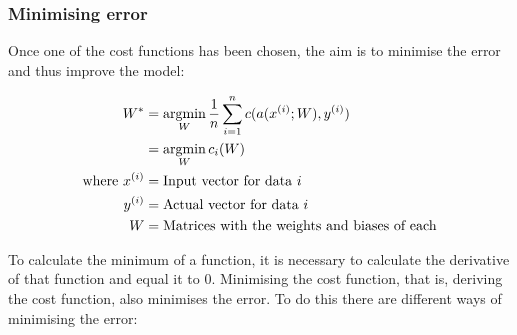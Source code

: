 \subsubsection{Minimising error}\label{minimizing-error}

Once one of the cost functions has been chosen, the aim is to minimise the error and thus improve the model:

\begin{equation}
\begin{split}
        W^* &= \operatorname*{argmin}_{W} \frac{1}{n} \sum_{i=1}^n c(a(x^{(i)}; W), y^{(i)}) \\
        &= \operatorname*{argmin}_{W} c_i(W) \\
        \text{where}~x^{(i)} &= \text{Input vector for data  }i \\
        y^{(i)} &= \text{Actual vector for data }i \\
        W &= \text{Matrices with the weights and biases of each} 
  \end{split}
\end{equation}

To calculate the minimum of a function, it is necessary to calculate the derivative of that function and equal it to $0$. Minimising the cost function, that is, deriving the cost function, also minimises the error. To do this there are different ways of minimising the error:

